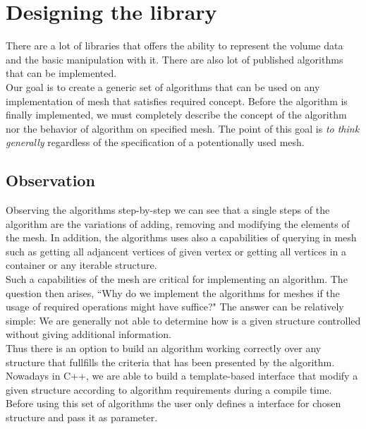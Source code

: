 \chapter{Designing the library}

There are a lot of libraries that offers the ability to represent the volume data
and the basic manipulation with it. There are also lot of published algorithms
that can be implemented.\\

Our goal is to create a generic set of algorithms that can be used on any implementation
of mesh that satisfies required concept. Before the algorithm is finally implemented,
we must completely describe the concept of the algorithm nor the behavior of algorithm
on specified mesh. The point of this goal is \emph{to think generally} regardless of
the specification of a potentionally used mesh.\\

\section{Observation}

Observing the algorithms step-by-step we can see that a single steps
of the algorithm are the variations of adding, removing and modifying the elements
of the mesh. In addition, the algorithms uses also a capabilities of querying
in mesh such as getting all adjancent vertices of given vertex or getting all
vertices in a container or any iterable structure.\\

Such a capabilities of the mesh are critical for implementing an algorithm.
The question then arises, ``Why do we implement the algorithms for meshes if
the usage of required operations might have suffice?" The answer can be relatively simple:
We are generally not able to determine how is a given structure controlled
without giving additional information.\\

Thus there is an option to build an algorithm working correctly over any structure
that fullfills the criteria that has been presented by the algorithm. Nowadays in C++,
we are able to build a template-based interface that modify a given structure according
to algorithm requirements during a compile time.\\

Before using this set of algorithms the user only defines a interface for chosen structure
and pass it as parameter.

